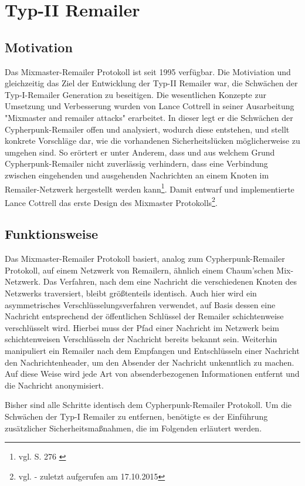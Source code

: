 \chapter{Typ-II Remailer}
\section{Motivation}
Das Mixmaster-Remailer Protokoll ist seit 1995 verfügbar. Die Motiviation und gleichzeitig das Ziel der Entwicklung der Typ-II Remailer war, die Schwächen der Typ-I-Remailer Generation zu beseitigen. Die wesentlichen Konzepte zur Umsetzung und Verbesserung wurden von Lance Cottrell in seiner Ausarbeitung "{}Mixmaster and remailer attacks"{} erarbeitet. In dieser legt er die Schwächen der Cypherpunk-Remailer offen und analysiert, wodurch diese entstehen, und stellt konkrete Vorschläge dar, wie die vorhandenen Sicherheitslücken möglicherweise zu umgehen sind. So erörtert er unter Anderem, dass und aus welchem Grund Cypherpunk-Remailer nicht zuverlässig verhindern, dass eine Verbindung zwischen eingehenden und ausgehenden Nachrichten an einem Knoten im Remailer-Netzwerk hergestellt werden kann\footnote{vgl. S. 276 \cite{oram2001peer}}. Damit entwarf und implementierte Lance Cottrell das erste Design des Mixmaster Protokolls\footnote{vgl. \cite{mixmastermanpage} - zuletzt aufgerufen am 17.10.2015}.

\section{Funktionsweise}
Das Mixmaster-Remailer Protokoll basiert, analog zum Cypherpunk-Remailer Protokoll, auf einem Netzwerk von Remailern, ähnlich einem Chaum'schen Mix-Netzwerk. Das Verfahren, nach dem eine Nachricht die verschiedenen Knoten des Netzwerks traversiert, bleibt größtenteils identisch. Auch hier wird ein asymmetrisches Verschlüsselungsverfahren verwendet, auf Basis dessen eine Nachricht entsprechend der öffentlichen Schlüssel der Remailer schichtenweise verschlüsselt wird. Hierbei muss der Pfad einer Nachricht im Netzwerk beim schichtenweisen Verschlüsseln der Nachricht bereits bekannt sein. Weiterhin manipuliert ein Remailer nach dem Empfangen und Entschlüsseln einer Nachricht den Nachrichtenheader, um den Absender der Nachricht unkenntlich zu machen. Auf diese Weise wird jede Art von absenderbezogenen Informationen entfernt und die Nachricht anonymisiert. 

Bisher sind alle Schritte identisch dem Cypherpunk-Remailer Protokoll. Um die Schwächen der Typ-I Remailer zu entfernen, benötigte es der Einführung zusätzlicher Sicherheitsmaßnahmen, die im Folgenden erläutert werden.


